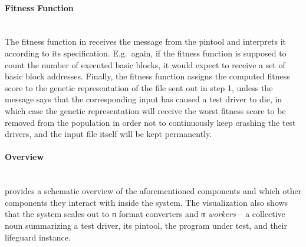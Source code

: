   \paragraph{Fitness Function} ~\\
  The fitness function in \xmlmate receives the message from the pintool and interprets it according to 
  its specification. E.g.\ again, if the fitness function is supposed to count the number of executed basic
  blocks, it would expect to receive a set of basic block addresses. Finally, the  fitness function assigns the
  computed fitness score to the genetic representation of the \xml file sent out in step 1, unless the message
  says that the corresponding input has caused a test driver to die, in which case the genetic representation
  will receive the worst fitness score to be removed from the population in order not to continuously keep
  crashing the test drivers, and the input file itself will be kept permanently.

\paragraph{Overview} ~\\
 provides a schematic overview of the aforementioned components and which other components 
they interact with inside the system. The visualization also shows that the system scales out to \texttt{n}
format converters and \texttt{m} \emph{workers} --
a collective noun summarizing a test driver, its pintool, the program under test, and their lifeguard
instance.

